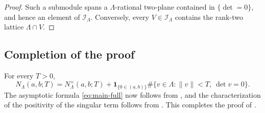 \documentclass[reqno,11pt]{amsart}
\theoremstyle{definition}
\theoremstyle{remark}
\numberwithin{equation}{section}
\begin{document}
\begin{proof}
Such a submodule spans a $\Lambda$-rational two-plane contained in
$\{\det=0\}$, and hence an element of $\mathcal I_\Lambda$. Conversely,
every $V\in\mathcal I_\Lambda$ contains the rank-two lattice
$\Lambda\cap V$.
\end{proof}

\subsection{Completion of the proof}

For every $T>0$,
$$
N_\Lambda(a,b;T)
=
N_\Lambda^\times(a,b;T)
+
\mathbf 1_{\{0\in(a,b)\}}
\#\{v\in\Lambda:\|v\|<T,\ \det v=0\}.
$$
The asymptotic formula \eqref{eq:main-full} now follows from
, and the characterization of
the positivity of the singular term follows from
. This completes the proof of
.
%
%
%
\def\cprime{$'$}
\end{document}
